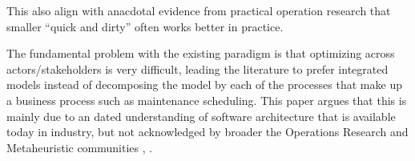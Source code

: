 This also align with anacdotal evidence from practical operation research 
that smaller ``quick and dirty'' often works better in practice. 

The fundamental problem with the existing paradigm is that optimizing across
actors/stakeholders is very difficult, leading the literature to prefer
integrated models instead of decomposing the model by each of the
processes that make up a business process such as maintenance scheduling.
This paper argues that this is mainly due to an dated understanding of
software architecture that is available today in industry, but not
acknowledged by broader the Operations Research and Metaheuristic
communities \citep{talbiMetaheuristicsDesignImplementation2009},
\citep{gendreauHandbookMetaheuristics2019}.
